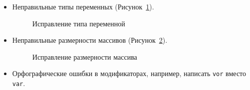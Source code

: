 \begin{itemize}
    \item Неправильные типы переменных (Рисунок~\ref{figTypes}).
    \begin{figure}[!h]
{\caption{Исправление типа переменной}\label{figTypes}}
\end{figure}

    \item Неправильные размерности массивов (Рисунок~\ref{figSize}).
    \begin{figure}[!h]
{\caption{Исправление размерности массива}\label{figSize}}
\end{figure}

    \item Орфографические ошибки в модификаторах, например, написать \texttt{vor} вместо \texttt{var}.
\end{itemize} 

